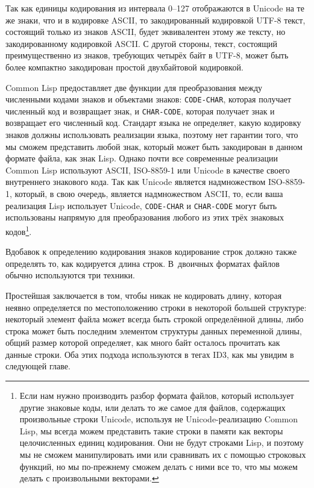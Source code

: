Так как единицы кодирования из интервала 0--127 отображаются в Unicode на те же знаки, что
и в кодировке ASCII, то закодированный кодировкой UTF-8 текст, состоящий только из знаков
ASCII, будет эквивалентен этому же тексту, но закодированному кодировкой ASCII. С другой
стороны, текст, состоящий преимущественно из знаков, требующих четырёх байт в UTF-8, может
быть более компактно закодирован простой двухбайтовой кодировкой.

Common Lisp предоставляет две функции для преобразования между численными кодами знаков и
объектами знаков: \lstinline{CODE-CHAR}, которая получает численный код и возвращает знак, и
\lstinline{CHAR-CODE}, которая получает знак и возвращает его численный код. Стандарт языка
не определяет, какую кодировку знаков должны использовать реализации языка, поэтому нет
гарантии того, что мы сможем представить любой знак, который может быть закодирован в
данном формате файла, как знак Lisp. Однако почти все современные реализации Common Lisp
используют ASCII, ISO-8859-1 или Unicode в качестве своего внутреннего знакового кода. Так
как Unicode является надмножеством ISO-8859-1, который, в свою очередь, является
надмножеством ASCII, то, если ваша реализация Lisp использует Unicode, \lstinline{CODE-CHAR}
и \lstinline{CHAR-CODE} могут быть использованы напрямую для преобразования любого из этих
трёх знаковых кодов\footnote{Если нам нужно производить разбор формата файлов, который
  использует другие знаковые коды, или делать то же самое для файлов, содержащих
  произвольные строки Unicode, используя не Unicode-реализацию Common Lisp, мы всегда
  можем представить такие строки в памяти как векторы целочисленных единиц
  кодирования. Они не будут строками Lisp, и поэтому мы не сможем манипулировать ими или
  сравнивать их с помощью строковых функций, но мы по-прежнему сможем делать с ними все
  то, что мы можем делать с произвольными векторами.}.

Вдобавок к определению кодирования знаков кодирование строк должно также определять то,
как кодируется длина строк. В~двоичных форматах файлов обычно используются три техники.

Простейшая заключается в том, чтобы никак не кодировать длину, которая неявно определяется
по местоположению строки в некоторой большей структуре: некоторый элемент файла может
всегда быть строкой определённой длины, либо строка может быть последним элементом
структуры данных переменной длины, общий размер которой определяет, как много байт осталось
прочитать как данные строки. Оба этих подхода используются в тегах ID3, как мы увидим в
следующей главе.

